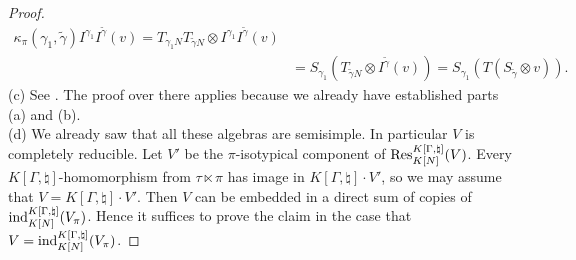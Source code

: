 \documentclass[11pt]{amsart}
\theoremstyle{definition}
\def\ind{{\rm ind}}
\def\Res{{\rm Res}}
\begin{document}
\begin{proof}
\begin{align*}
\kappa_\pi (\gamma_1, \tilde{\gamma}) I^{\gamma_1} I^{\tilde{\gamma}}(v)
= T_{\gamma_1 N} T_{\tilde{\gamma} N} \otimes I^{\gamma_1} I^{\tilde{\gamma}}(v) \\
& = S_{\gamma_1} (T_{\tilde{\gamma} N} \otimes I^{\tilde{\gamma}}(v)) =
S_{\gamma_1} (T (S_{\tilde \gamma} \otimes v)) .
\end{align*}
(c) See \cite[Theorem 11.2.b]{SolGHA}. The proof over there applies because we already
have established parts (a) and (b).\\
(d) We already saw that all these algebras are semisimple. In particular $V$ is
completely reducible. Let $V'$ be the $\pi$-isotypical component of 
$\Res^{K[\Gamma,\natural]}_{K[N]}(V)$. Every $K[\Gamma,\natural]$-homomorphism from
$\tau \ltimes \pi$ has image in $K[\Gamma,\natural] \cdot V'$, so we may assume that
$V = K[\Gamma,\natural] \cdot V'$. Then $V$ can be embedded in a direct sum of copies
of $\ind_{K [N]}^{K[\Gamma,\natural]} (V_\pi)$. Hence it suffices to prove the claim
in the case that $V = \ind_{K [N]}^{K[\Gamma,\natural]} (V_\pi)$. 


\end{proof}
\end{document}
